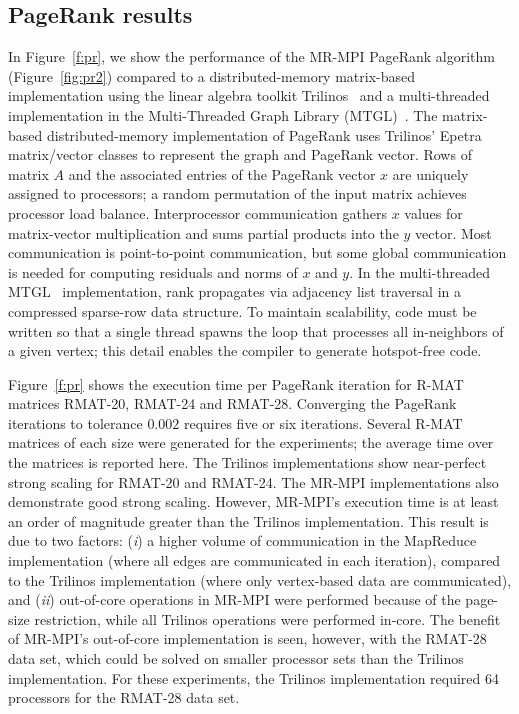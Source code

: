 \subsection{PageRank results}

In Figure~\ref{f:pr}, we show the performance of the MR-MPI PageRank algorithm
(Figure~\ref{fig:pr2}) compared to a
distributed-memory matrix-based implementation using the linear
algebra toolkit Trilinos~\cite{Trilinos-Overview} 
and a multi-threaded
implementation
in the Multi-Threaded Graph Library (MTGL)~\cite{MTGL}.
The matrix-based distributed-memory implementation of PageRank
uses Trilinos' Epetra matrix/vector classes to represent the graph and
PageRank vector.
Rows of matrix $A$ and the associated entries of the PageRank vector $x$
are uniquely assigned to processors; a random permutation of the input
matrix achieves processor load balance.
Interprocessor communication gathers $x$ values for matrix-vector
multiplication and sums partial products into the $y$ vector.
Most communication is point-to-point communication,
but some global communication is needed for computing
residuals and norms of $x$ and $y$.
In the multi-threaded MTGL~\cite{MTGL} implementation,
rank propagates via adjacency list traversal
in a compressed sparse-row data structure.
To maintain scalability, code must
be written so that a single thread spawns the loop that processes all
in-neighbors of a given vertex; this detail enables the compiler to generate
hotspot-free code.

Figure~\ref{f:pr} shows the execution time per PageRank iteration for
R-MAT matrices RMAT-20, RMAT-24 and RMAT-28.  
Converging the PageRank iterations
to tolerance $0.002$ requires five or six iterations.
Several R-MAT matrices of 
each size were generated for the experiments; the average time over the
matrices is reported here.  
The Trilinos implementations show near-perfect
strong scaling for RMAT-20 and RMAT-24.  The MR-MPI 
implementations also demonstrate good strong scaling.  However, MR-MPI's
execution time is at least an order of magnitude greater than the Trilinos
implementation.  This result is due to two factors:  ({\it i}) a 
higher volume of
communication in the MapReduce implementation (where all edges are communicated
in each iteration), compared to the Trilinos implementation (where only
vertex-based data are communicated), and ({\it ii}) out-of-core operations
in MR-MPI were performed because of the page-size restriction, while all
Trilinos operations were performed in-core.  The benefit of MR-MPI's
out-of-core implementation is seen, however, with the RMAT-28 data set, 
which could be solved on smaller processor sets than the Trilinos 
implementation.  For these experiments, the Trilinos implementation required
64 processors for the RMAT-28 data set. 

